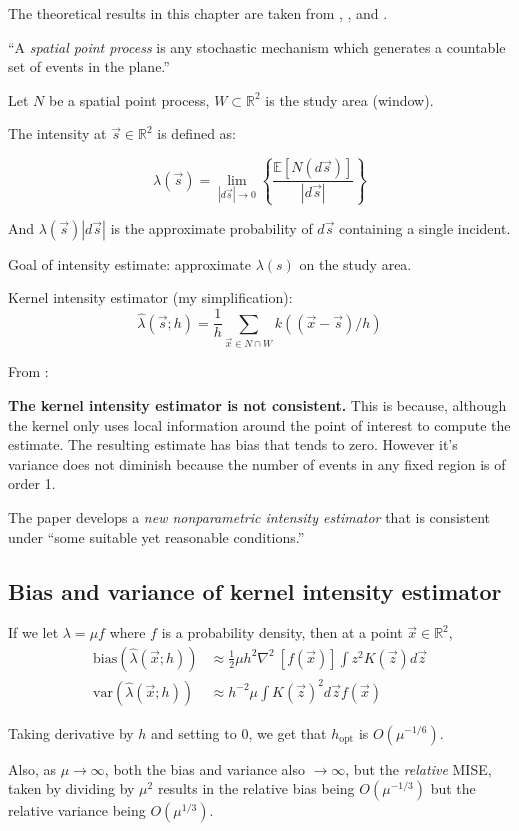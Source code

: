 


The theoretical results in this chapter are taken from \citet{diggle1988equivalence}, \citet{guan2008consistent}, and \citet{wand1994kernel}.

\begin{defn}
``A \textit{spatial point process} is any stochastic mechanism which generates a countable set of events in the plane.''
\end{defn}

Let \(N\) be a spatial point process, \(W \subset \mathbb{R}^2 \) is the study area (window).

The intensity at \(\vec{s} \in \mathbb{R}^2\) is defined as:

\[
    \lambda (\vec{s}) = \lim_{|d\vec{s}| \to 0} \left\{ \frac{\mathbb{E}[N(d\vec{s})]}{|d\vec{s}|} \right\}
\]

And \(\lambda(\vec{s})|d\vec{s}|\) is the approximate probability of \(d\vec{s}\) containing a single incident.

Goal of intensity estimate: approximate \(\lambda(s)\) on the study area.

Kernel intensity estimator (my simplification):
\[
    \hat{\lambda}(\vec{s}; h) = \frac{1}{h} \sum_{\vec{x} \in N \cap W}{k((\vec{x}-\vec{s})/h)}
\]

From \citet{guan2008consistent}:

{
\color{red}
\textbf{The kernel intensity estimator is not consistent.}
This is because, although the kernel only uses local information around the point of interest to compute the estimate.
The resulting estimate has bias that tends to zero.
However it's variance does not diminish because the number of events in any fixed region is of order 1.
}

The paper develops a \textit{new nonparametric intensity estimator} that is consistent under ``some suitable yet reasonable conditions.''

\subsection{Bias and variance of kernel intensity estimator}

If we let \(\lambda = \mu f\) where \(f\) is a probability density, then at a point \(\vec{x} \in \mathbb{R}^2\),
\begin{align}
\mbox{bias}(\hat{\lambda}(\vec{x};h)) & \approx \frac{1}{2} \mu h^2 \nabla^2~\left[ f(\vec{x}) \right] \int {z^2 K(\vec{z}) d\vec{z}} \\
\mbox{var}(\hat{\lambda}(\vec{x};h)) & \approx h^{-2} \mu \int {K(\vec{z})^2d\vec{z}} f(\vec{x})
\end{align}

Taking derivative by \(h\) and setting to \(0\), we get that \(h_{\mbox{opt}}\) is \(O(\mu^{-1/6})\).

Also, as \(\mu \to \infty\), both the bias and variance also \(\to \infty\),
but the \textit{relative} MISE, taken by dividing by \(\mu^2\) results in the relative bias being \(O(\mu^{-1/3})\)
but the relative variance being \(O(\mu^{1/3})\).



